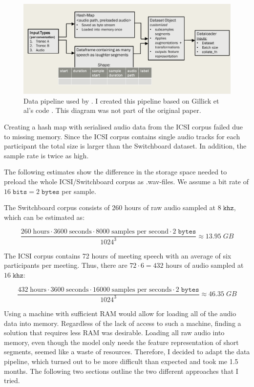 \documentclass[bsc,frontabs,parskip,deptreport]{infthesis}
\begin{document}
\begin{figure}
    \centering
    \includegraphics[width=14cm]{imgs/diagrams/Gillick_et_al_data_pipeline.png}
    \caption{Data pipeline used by \citet{gillick2021robust}. I created this pipeline based on Gillick et al's code \citep{gillick-codebase}. This diagram was not part of the original paper.}
    \label{fig:gillick-data-pipeline}
\end{figure}

Creating a hash map with serialised audio data from the ICSI corpus failed due to missing memory. Since the ICSI corpus contains single audio tracks for each participant the total size is larger than the Switchboard dataset. In addition, the sample rate is twice as high. 

The following estimates show the difference in the storage space needed to preload the whole ICSI/Switchboard corpus as .wav-files. We assume a bit rate of $16\;\mathtt{bits}=2\;\mathtt{bytes}$ per sample.

The Switchboard corpus consists of 260 hours of raw audio sampled at $8\;\mathtt{khz}$, which can be estimated as:

$$ \frac{260\;\textrm{hours} \cdot 3600\;\textrm{seconds} \cdot 8000\;\textrm{samples per second} \cdot 2\;\mathtt{bytes}}{1024^3} \approx 13.95 \mathtt\;{GB} $$  

The ICSI corpus contains 72 hours of meeting speech with an average of six participants per meeting. Thus, there are $72 \cdot 6=432$ hours of audio sampled at $16\;\mathtt{khz}$:

$$ \frac{432\;\textrm{hours} \cdot 3600\;\textrm{seconds} \cdot 16000 \;\textrm{samples per seconds} \cdot 2\;\mathtt{bytes}}{1024^3} \approx 46.35 \mathtt\;{GB} $$

Using a machine with sufficient RAM would allow for loading all of the audio data into memory. 
Regardless of the lack of access to such a machine, finding a solution that requires less RAM was desirable. Loading all raw audio into memory, even though the model only needs the feature representation of short segments, seemed like a waste of resources. Therefore, I decided to adapt the data pipeline, which turned out to be more difficult than expected and took me 1.5 months. The following two sections outline the two different approaches that I tried. 
\end{document}
